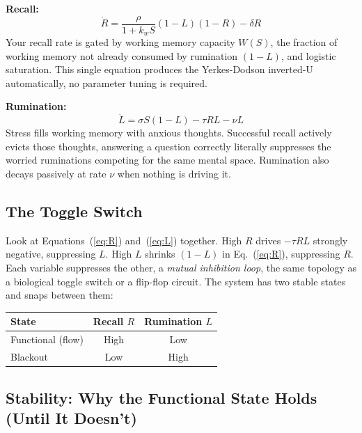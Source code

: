 \documentclass[11pt,a4paper]{article}
\begin{document}
\textbf{Recall:}
\begin{equation}
  \dot{R} = \frac{\rho}{1 + k_w S}(1-L)(1-R) - \delta R
  \label{eq:R}
\end{equation}
Your recall rate is gated by working memory capacity $W(S)$,
the fraction of working memory not already consumed by rumination
$(1-L)$, and logistic saturation. This single equation produces
the Yerkes-Dodson inverted-U automatically, no parameter tuning is
required.

\textbf{Rumination:}
\begin{equation}
  \dot{L} = \sigma S(1-L) - \tau R L - \nu L
  \label{eq:L}
\end{equation}
Stress fills working memory with anxious thoughts. Successful recall
actively evicts those thoughts, answering a question correctly
literally suppresses the worried ruminations competing for the same
mental space. Rumination also decays passively at rate $\nu$ when
nothing is driving it.

\subsection{The Toggle Switch}

Look at Equations~(\ref{eq:R}) and~(\ref{eq:L}) together. High $R$
drives $-\tau RL$ strongly negative, suppressing $L$. High $L$
shrinks $(1-L)$ in Eq.~(\ref{eq:R}), suppressing $R$. Each variable
suppresses the other, a \emph{mutual inhibition loop}, the same
topology as a biological toggle switch or a flip-flop circuit.
The system has two stable states and snaps between them:

\begin{center}
\begin{tabular}{lcc}
\toprule
\textbf{State} & \textbf{Recall $R$} & \textbf{Rumination $L$} \\
\midrule
Functional (flow) & High & Low \\
Blackout          & Low  & High \\
\bottomrule
\end{tabular}
\end{center}

\subsection{Stability: Why the Functional State Holds (Until It Doesn't)}
\end{document}
